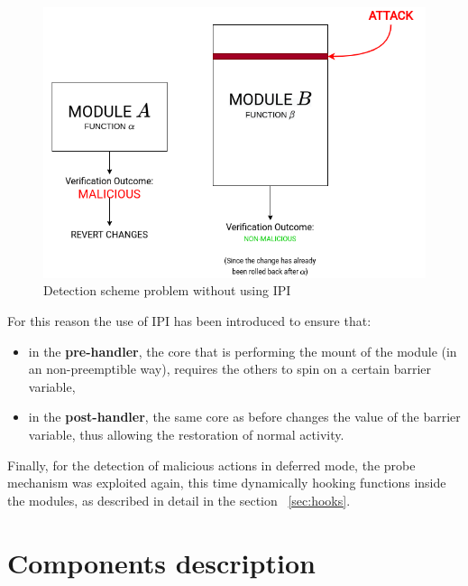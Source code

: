 \documentclass{article}
\begin{document}
	\begin{figure}[!htbp]
		\centering
		\includegraphics[scale=0.4]{concurrency}
		\caption{Detection scheme problem without using IPI}
		\label{fig:concurrency}
	\end{figure}

	For this reason the use of IPI has been introduced to ensure that:
	\begin{itemize}
		\item in the \textbf{pre-handler}, the core that is performing the mount of the module (in an non-preemptible way),
		requires the others to spin on a certain barrier variable,
		\item in the \textbf{post-handler}, the same core as before changes the value of the barrier variable, thus
		allowing the restoration of normal activity.
	\end{itemize}

	Finally, for the detection of malicious actions in deferred mode, the probe mechanism was exploited again, this
	time dynamically hooking functions inside the modules, as described in detail in the section ~\ref{sec:hooks}.

	\section{Components description}
\end{document}
